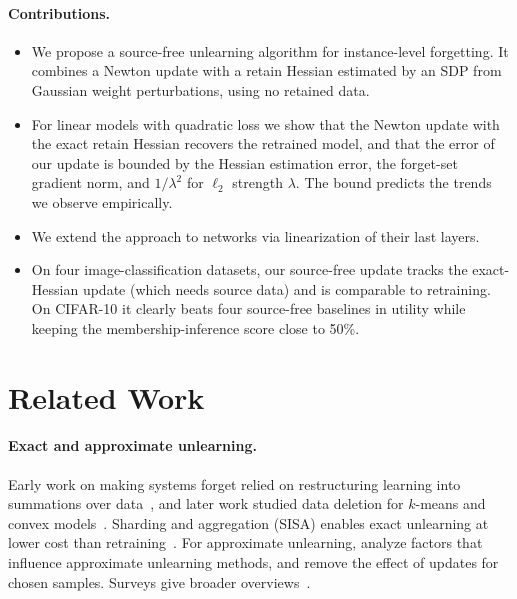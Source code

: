 \documentclass[10pt,twocolumn,letterpaper]{article}
\begin{document}
\paragraph{Contributions.}
\begin{itemize}
  \item We propose a source-free unlearning algorithm for instance-level forgetting. It combines a Newton update with a retain Hessian estimated by an SDP from Gaussian weight perturbations, using no retained data.
  \item For linear models with quadratic loss we show that the Newton update with the exact retain Hessian recovers the retrained model, and that the error of our update is bounded by the Hessian estimation error, the forget-set gradient norm, and $1/\lambda^2$ for $\ell_2$ strength $\lambda$. The bound predicts the trends we observe empirically.
  \item We extend the approach to networks via linearization of their last layers.
  \item On four image-classification datasets, our source-free update tracks the exact-Hessian update (which needs source data) and is comparable to retraining. On CIFAR-10 it clearly beats four source-free baselines in utility while keeping the membership-inference score close to 50\%.
\end{itemize}

\section{Related Work}
\label{sec:related_work}
\paragraph{Exact and approximate unlearning.}
Early work on making systems forget relied on restructuring learning into summations over data~\cite{cao2015towards}, and later work studied data deletion for $k$-means and convex models~\cite{ginart2019making,neel2021descent}. Sharding and aggregation (SISA) enables exact unlearning at lower cost than retraining~\cite{bourtoule2021machine}. For approximate unlearning, \cite{thudi2022unrolling} analyze factors that influence approximate unlearning methods, and \cite{graves2021amnesiac} remove the effect of updates for chosen samples. Surveys give broader overviews~\cite{xu2023machine,xu2024machine}.
\end{document}
